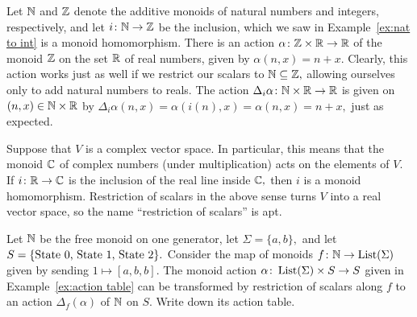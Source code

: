 \documentclass[../main/CT4S-EN-RU]{subfiles}
\begin{document}
\begin{proofRUS}
\end{proofRUS}

\begin{exampleENG}
Let ${\mathbb N}$ and ${\mathbb Z}$ denote the additive monoids of natural numbers and integers, respectively, and let $i\colon{\mathbb N}\rightarrow{\mathbb Z}$ be the inclusion, which we saw in Example~\ref{ex:nat to int} is a monoid homomorphism. There is an action $\alpha\colon{\mathbb Z}\times{\mathbb R}\rightarrow{\mathbb R}$ of the monoid ${\mathbb Z}$ on the set ${\mathbb R}$ of real numbers, given by $\alpha(n,x)=n+x.$ Clearly, this action works just as well if we restrict our scalars to ${\mathbb N}\subseteq{\mathbb Z},$ allowing ourselves only to add natural numbers to reals. The action $\Delta_i\alpha\colon{\mathbb N}\times{\mathbb R}\rightarrow{\mathbb R}$ is given on $(n,x)\in{\mathbb N}\times{\mathbb R}$ by $\Delta_i\alpha(n,x)=\alpha(i(n),x)=\alpha(n,x)=n+x,$ just as expected.
\end{exampleENG}

\begin{exampleRUS}
\end{exampleRUS}

\begin{exampleENG}
Suppose that $V$ is a complex vector space. In particular, this means that the monoid ${\mathbb C}$ of complex numbers (under multiplication) acts on the elements of $V.$ If $i\colon{\mathbb R}\rightarrow{\mathbb C}$ is the inclusion of the real line inside ${\mathbb C},$ then $i$ is a monoid homomorphism. Restriction of scalars in the above sense turns $V$ into a real vector space, so the name “restriction of scalars” is apt.
\end{exampleENG}

\begin{exampleRUS}
\end{exampleRUS}

\begin{exerciseENG}
Let ${\mathbb N}$ be the free monoid on one generator, let $\Sigma=\{a,b\},$ and let $S=\{\textnormal{State 0, State 1, State 2}\}.$ Consider the map of monoids $f\colon{\mathbb N}\rightarrow\operatorname{List}(\Sigma)$ given by sending $1\mapsto [a,b,b].$ The monoid action $\alpha\colon\operatorname{List}(\Sigma)\times S\rightarrow S$ given in Example~\ref{ex:action table} can be transformed by restriction of scalars along $f$ to an action $\Delta_f(\alpha)$ of ${\mathbb N}$ on $S.$ Write down its action table.
\end{exerciseENG}

\begin{exerciseRUS}
\end{exerciseRUS}
\end{document}
